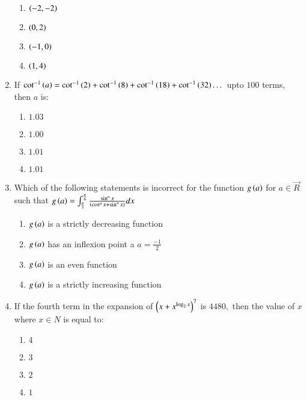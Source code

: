 \documentclass[journal,12pt,twocolumn]{IEEEtran}
\theoremstyle{remark}
\begin{document}
\begin{enumerate}
    \begin{enumerate}
        \item $\left(-2,-2\right)$
        \item $\left(0,2\right)$
        \item $\left(-1,0\right)$
        \item $\left(1,4\right)$\\
    \end{enumerate}
    \item If $\cot^{-1}\left(a\right)=\cot^{-1}\left(2\right)+\cot^{-1}\left(8\right)+\cot^{-1}\left(18\right)+\cot^{-1}\left(32\right)\dots$ upto $100$ terms, then $a$ is:
    \begin{enumerate}
        \item $1.03$
        \item $1.00$
        \item $1.01$
        \item $1.01$\\
    \end{enumerate}
    \item Which of the following statements is incorrect for the function $g\left(a\right)$ for $a\in\Vec{R}$ such that $g\left(a\right)=\int_{\frac{\pi}{3}}^{\frac{\pi}{6}}\frac{\sin^a{x}}{\left(\cos^a{x}+\sin^a{x}\right)}dx$
    \begin{enumerate}
        \item $g\left(a\right)$ is a strictly decreasing function
        \item $g\left(a\right)$ has an inflexion point a $a=\frac{-1}{2}$
        \item $g\left(a\right)$ is an even function
        \item $g\left(a\right)$ is a strictly increasing function\\
    \end{enumerate}
    \item If the fourth term in the expansion of $\left(x+x^{\log_{2}x}\right)^7$ is $4480,$ then the value of $x$ where $x\in N$ is equal to:
    \begin{enumerate}
        \item $4$
        \item $3$
        \item $2$
        \item $1$
    \end{enumerate}  
\end{enumerate}
\end{document}
